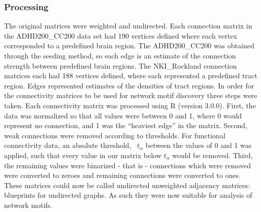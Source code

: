 \subsubsection{Processing}
The original matrices were weighted and undirected. Each connection matrix in the ADHD200\_CC200 data set had 190 vertices defined where each vertex corresponded to a predefined brain region. The ADHD200\_CC200 was obtained through the seeding method, so each edge is an estimate of the connection strength between predefined brain regions. The NKI\_Rockland connection matrices each had 188 vertices defined, where each represented a predefined tract region. Edges represented estimates of the densities of tract regions. 
In order for the connectivity matrices to be used for network motif discovery three steps were taken. Each connectivity matrix was processed using R (version 3.0.0). First, the data was normalized so that all values were between 0 and 1, where 0 would represent no connection, and 1 was the ``heaviest edge'' in the matrix.  Second, weak connections were removed according to thresholds. For functional connectivity data, an absolute threshold,  \ $t_{\alpha}$ between the values of 0 and 1 was applied, such that every value in our matrix below $t_{\alpha}$ would be removed. Third, the remaining values were binarized - that is - connections which were removed were converted to zeroes and remaining connections were converted to ones. These matrices could now be called undirected unweighted adjacency matrices: blueprints for undirected graphs. As such they were now suitable for analysis of network motifs.\\

